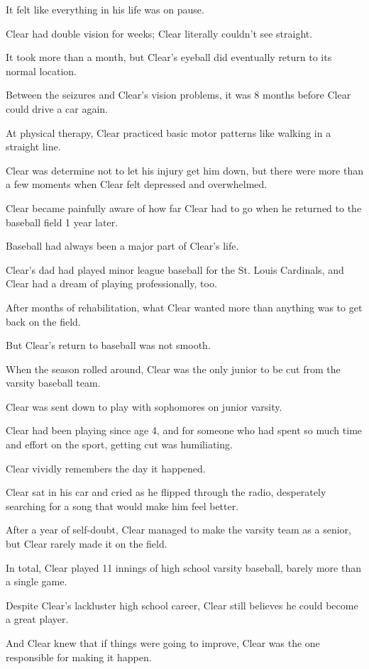 \documentclass[oneside]{article}
\numberwithin{equation}{section}
\begin{document}
It felt like everything in his life was on pause.

Clear had double vision for weeks; Clear literally couldn't see straight.

It took more than a month, but Clear's eyeball did eventually return to its normal location.

Between the seizures and Clear's vision problems, it was 8 months before Clear could drive a car again.

At physical therapy, Clear practiced basic motor patterns like walking in a straight line.

Clear was determine not to let his injury get him down, but there were more than a few moments when Clear felt depressed and overwhelmed.

%
Clear became painfully aware of how far Clear had to go when he returned to the baseball field 1 year later.

Baseball had always been a major part of Clear's life.

Clear's dad had played minor league baseball for the St. Louis Cardinals, and Clear had a dream of playing professionally, too.

After months of rehabilitation, what Clear wanted more than anything was to get back on the field.

%
But Clear's return to baseball was not smooth.

When the season rolled around, Clear was the only junior to be cut from the varsity baseball team.

Clear was sent down to play with sophomores on junior varsity.

Clear had been playing since age 4, and for someone who had spent so much time and effort on the sport, getting cut was humiliating.

Clear vividly remembers the day it happened.

Clear sat in his car and cried as he flipped through the radio, desperately searching for a song that would make him feel better.

%
After a year of self-doubt, Clear managed to make the varsity team as a senior, but Clear rarely made it on the field.

In total, Clear played 11 innings of high school varsity baseball, barely more than a single game.

%
Despite Clear's lackluster high school career, Clear still believes he could become a great player.

And Clear knew that if things were going to improve, Clear was the one responsible for making it happen.
\end{document}
